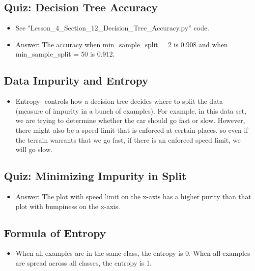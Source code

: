 \documentclass[12pt]{report}
\begin{document}
\subsection{Quiz: Decision Tree Accuracy}

\begin{itemize}

\item See "Lesson\_4\_Section\_12\_Decision\_Tree\_Accuracy.py'' code. 

\item Answer: The accuracy when min\_sample\_split = 2 is 0.908 and when min\_sample\_split = 50 is 0.912. 

\end{itemize}

\subsection{Data Impurity and Entropy}

\begin{itemize}

\item Entropy- controls how a decision tree decides where to split the data (measure of impurity in a bunch of examples). For example, in this data set, we are trying to determine whether the car should go fast or slow. However, there might also be a speed limit that is enforced at certain places, so even if the terrain warrants that we go fast, if there is an enforced speed limit, we will go slow. 

\end{itemize}

\subsection{Quiz: Minimizing Impurity in Split}

\begin{itemize}

\item Answer: The plot with speed limit on the x-axis has a higher purity than that plot with bumpiness on the x-axis. 

\end{itemize}

\subsection{Formula of Entropy}

\begin{itemize}

\item When all examples are in the same class, the entropy is 0. When all examples are spread across all classes, the entropy is 1. 

\end{itemize}
\end{document}
